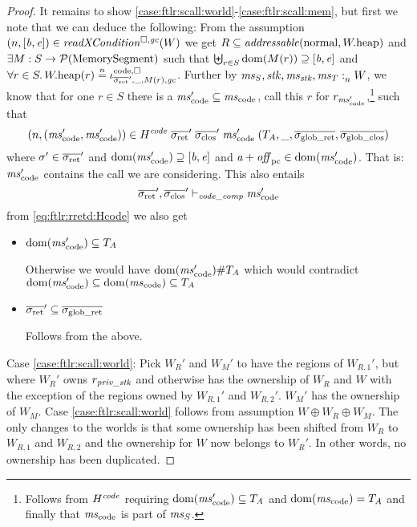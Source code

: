 \begin{proof}
  It remains to show \ref{case:ftlr:scall:world}-\ref{case:ftlr:scall:mem}, but first we note that we can deduce the following: From the assumption $\npair{[\baddr,\eaddr]} \in \xReadCond{W}$ we get $R \subseteq \addressable{\normal, \pwheap}$ and $\exists M : S \rightarrow \mathcal{P}(\mathrm{MemorySegment})$ such that $\biguplus_{r\in S} \mathrm{dom}(M(r)) \supseteq [\mathit{b},\mathit{e}]$ and $\forall r \in S \ldotp \pwheap(r) \nequal \codereg{\sigrets',\_,M(r),\gc}$.
  Further by $\mathit{ms}_S,\mathit{stk},\mathit{ms}_{\mathit{stk}},\mathit{ms}_T :_{n}^{}W$, we know that for one $r \in S$ there is a $\mscode' \subseteq \mscode$, call this $r$ for $r_{\mscode'}$,\footnote{Follows from $H^{\mathit{code}}$ requiring $\dom(\mscode') \subseteq \ta$ and $\dom(\mscode) = \ta$ and finally that $\mscode$ is part of $\mathit{ms}_S$.}
  such that
  \begin{equation}
    \npair{(\mscode',\mscode')} \in H^{\var{code}} \; \sigrets' \; \sigcloss' \; \mscode' \; (\ta,\_,\gsigrets,\gsigcloss)\label{eq:ftlr:rretd:Hcode}
  \end{equation}
  where $\sigma' \in \sigrets'$ and $\dom(\mscode') \supseteq [\baddr,\eaddr]$ and $\aaddr + \offpc \in \dom(\mscode')$.
  That is: $\mscode'$ contains the call we are considering.
  This also entails
  \begin{equation}
    \label{eq:ftlr:code-comp-jud}
    \sigrets',\sigcloss' \vdash_\var{code\_comp} \mscode'
  \end{equation}
  from \ref{eq:ftlr:rretd:Hcode} we also get
\begin{itemize}
\item $\dom(\mscode') \subseteq \ta$

  Otherwise we would have $\dom(\mscode') \# \ta$ which would contradict $\dom(\mscode') \subseteq \dom(\mscode) \subseteq\ta$

\item $\sigrets' \subseteq \gsigrets$

  Follows from the above.
\end{itemize}


  Case \ref{case:ftlr:scall:world}: Pick $W_R'$ and $W_M'$ to have the regions of $W_{R,1}'$, but where $W_R'$ owns $r_{\mathit{priv\_stk}}$ and otherwise has the ownership of $W_R$ and $W$ with the exception of the regions owned by $W_{R,1}'$ and $W_{R,2}'$.
  $W_M'$ has the ownership of $W_M$.
  Case \ref{case:ftlr:scall:world} follows from assumption $W \oplus W_R \oplus W_M$.
  The only changes to the worlds is that some ownership has been shifted from $W_R$ to $W_{R,1}$ and $W_{R,2}$ and the ownership for $W$ now belongs to $W_R'$.
  In other words, no ownership has been duplicated.


\end{proof}
